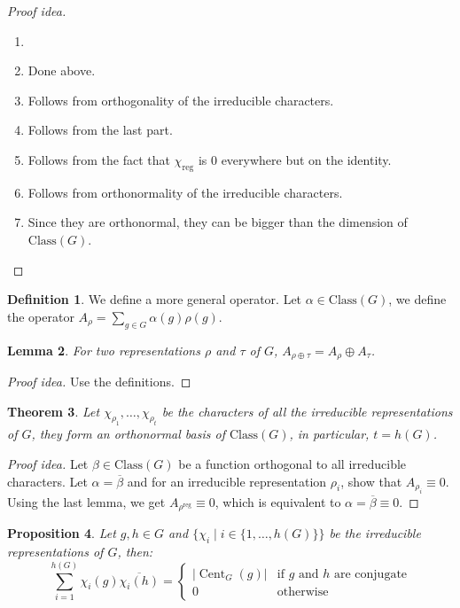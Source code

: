 \documentclass[paper=a4, fontsize=12pt]{scrartcl} %
\newtheorem{thm}{Theorem}[section]
\newtheorem{prop}[thm]{Proposition}
\newtheorem{lem}[thm]{Lemma}
\theoremstyle{definition}
\newtheorem{defn}[thm]{Definition}
\theoremstyle{remark}
\DeclareMathOperator{\cent}{Cent}
\numberwithin{equation}{section} %
\numberwithin{figure}{section} %
\numberwithin{table}{section} %
\begin{document}
\begin{proof}[Proof idea]
	\begin{enumerate}
		\item[]
		\item Done above.
		\item Follows from orthogonality of the irreducible characters.
		\item Follows from the last part.
		\item Follows from the fact that $\chi_{\text{reg}}$ is 0 everywhere but on the identity.
		\item Follows from orthonormality of the irreducible characters.
		\item Since they are orthonormal, they can be bigger than the dimension of $\text{Class}(G)$.
	\end{enumerate}
\end{proof}
\begin{defn}
	We define a more general operator. Let $\alpha \in \text{Class}(G)$, we define the operator $A_{\rho} = \sum_{g \in G} \alpha(g)\rho(g)$.
\end{defn}
\begin{lem}
	For two representations $\rho$ and $\tau$ of $G$, $A_{\rho \oplus \tau} = A_{\rho} \oplus A_{\tau}$.
\end{lem}
\begin{proof}[Proof idea]
	Use the definitions.
\end{proof}
\begin{thm}
	Let $\chi_{\rho_1}, \dots, \chi_{\rho_t}$ be the characters of all the irreducible representations of $G$, they form an orthonormal basis of $\text{Class}(G)$, in particular, $t = h(G)$.
\end{thm}
\begin{proof}[Proof idea]
	Let $\beta \in \text{Class}(G)$ be a function orthogonal to all irreducible characters. Let $\alpha = \overline{\beta}$ and for an irreducible representation $\rho_i$, show that $A_{\rho_i} \equiv 0$. Using the last lemma, we get $A_{\rho^{\text{reg}}} \equiv 0$, which is equivalent to $\alpha = \overline{\beta} \equiv 0$.
\end{proof}
\begin{prop}
	Let $g, h \in G$ and $\{\chi_i \mid i \in \{1,\dots, h(G)\}\}$ be the irreducible representations of $G$, then:\[ \sum_{i=1}^{h(G)} \chi_i(g)\overline{\chi_i(h)} = \begin{cases}|\cent_G(g)| & \mbox{if $g$ and $h$ are conjugate}\\0& \mbox{otherwise}\end{cases} \]
\end{prop}
\end{document}
